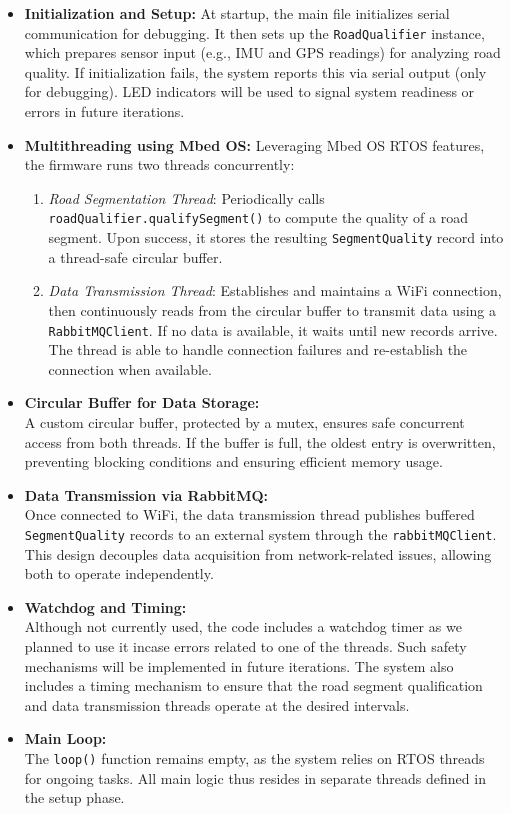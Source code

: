 \begin{itemize}
    \item \textbf{Initialization and Setup:}  
    At startup, the main file initializes serial communication for debugging. It then sets up the \texttt{RoadQualifier} instance, which prepares sensor input (e.g., IMU and GPS readings) for analyzing road quality. If initialization fails, the system reports this via serial output (only for debugging). LED indicators will be used to signal system readiness or errors in future iterations.

    \item \textbf{Multithreading using Mbed OS:}  
    Leveraging Mbed OS RTOS features, the firmware runs two threads concurrently:
    \begin{enumerate}
        \item \textit{Road Segmentation Thread}: Periodically calls \texttt{roadQualifier.qualifySegment()} to compute the quality of a road segment. Upon success, it stores the resulting \texttt{SegmentQuality} record into a thread-safe circular buffer.
        \item \textit{Data Transmission Thread}: Establishes and maintains a WiFi connection, then continuously reads from the circular buffer to transmit data using a \texttt{RabbitMQClient}. If no data is available, it waits until new records arrive. The thread is able to handle connection failures and re-establish the connection when available.
    \end{enumerate}

    \item \textbf{Circular Buffer for Data Storage:}  \\
    A custom circular buffer, protected by a mutex, ensures safe concurrent access from both threads. If the buffer is full, the oldest entry is overwritten, preventing blocking conditions and ensuring efficient memory usage.

    \item \textbf{Data Transmission via RabbitMQ:}  \\
    Once connected to WiFi, the data transmission thread publishes buffered \texttt{SegmentQuality} records to an external system through the \texttt{rabbitMQClient}. This design decouples data acquisition from network-related issues, allowing both to operate independently.

    \item \textbf{Watchdog and Timing:}  \\
    Although not currently used, the code includes a watchdog timer as we planned to use it incase errors related to one of the threads. Such safety mechanisms will be implemented in future iterations.
    The system also includes a timing mechanism to ensure that the road segment qualification and data transmission threads operate at the desired intervals.

    \item \textbf{Main Loop:}  \\
    The \texttt{loop()} function remains empty, as the system relies on RTOS threads for ongoing tasks. All main logic thus resides in separate threads defined in the setup phase.
\end{itemize}

